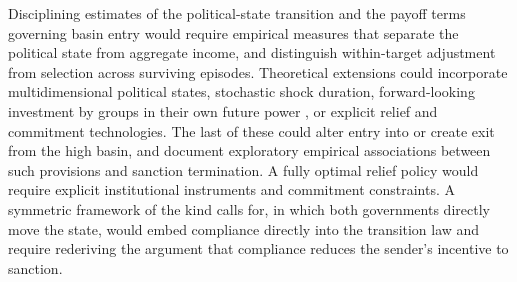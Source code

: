  Disciplining estimates of the political-state
transition and the payoff terms governing basin entry would require empirical measures
that separate the political state from aggregate income, and distinguish within-target
adjustment from selection across surviving episodes. Theoretical extensions could
incorporate multidimensional political states, stochastic shock duration,
forward-looking investment by groups in their own future power
\citep{AcemogluRobinson2008}, or explicit relief and commitment technologies. The last of
these could alter entry into or create exit from the high basin, and
\citet{AttiaGrauvogel2023} document exploratory empirical associations between such
provisions and sanction termination. A fully optimal relief policy would require explicit
institutional instruments and commitment constraints. A symmetric framework of the kind \citet{Powell2013} calls for, in which both
governments directly move the state, would
embed compliance directly into the transition law and require rederiving the argument
that compliance reduces the sender's incentive to sanction.
